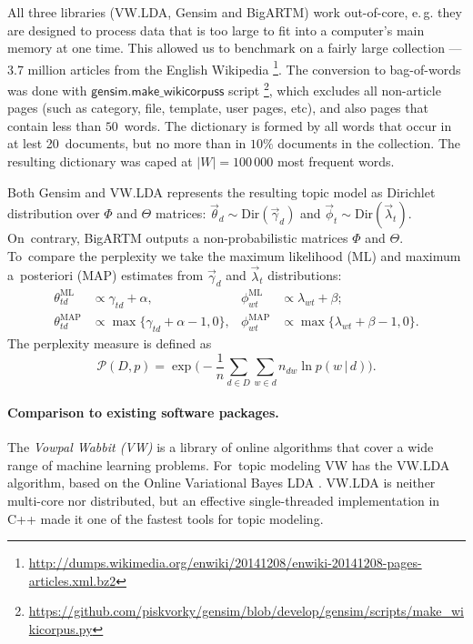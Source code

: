 \documentclass[russian]{llncs}
\newcommand{\cond}{\mspace{3mu}{|}\mspace{3mu}}
\newcommand{\kw}[1]{\textsf{#1}}
\begin{document}
All three libraries (VW.LDA, Gensim and BigARTM) work out-of-core,
e.\,g. they are designed to process data that is too large to fit into a computer's main memory at one time.
This allowed us to benchmark on a fairly large collection --- 3.7 million articles from the English Wikipedia%
\footnote{\url{http://dumps.wikimedia.org/enwiki/20141208/enwiki-20141208-pages-articles.xml.bz2}}.
The conversion to bag-of-words was done with $\kw{gensim.make\_wikicorpuss}$ script%
\footnote{\url{https://github.com/piskvorky/gensim/blob/develop/gensim/scripts/make_wikicorpus.py}},
which excludes all non-article pages (such as category, file, template, user pages, etc),
and also pages that contain less than $50$~words.
The dictionary is formed by all words that occur in at lest 20~documents,
but no more than in $10\%$ documents in the collection.
The resulting dictionary was caped at $|W| = 100\,000$ most frequent words.

Both Gensim and VW.LDA represents the resulting topic model as Dirichlet distribution over $\Phi$ and $\Theta$ matrices:
$\vec{\theta}_{d} \sim \text{Dir}(\vec{\gamma}_d)$ and
$\vec{\phi}_{t} \sim \text{Dir}(\vec{\lambda}_t)$.
On~contrary, BigARTM outputs a non-probabilistic matrices $\Phi$ and $\Theta$.
To~compare the perplexity we take the maximum likelihood (ML) and maximum a~posteriori (MAP) estimates
from $\vec{\gamma}_d$ and $\vec{\lambda}_t$ distributions:
\begin{align*}
	\theta^{\mathrm{ML}}_{td} &\propto \gamma_{td}+\alpha, &
    \phi^{\mathrm{ML}}_{wt} &\propto \lambda_{wt}+\beta;
\\
	\theta^{\mathrm{MAP}}_{td} &\propto \max\{\gamma_{td}+\alpha-1,0\}, &
    \phi^{\mathrm{MAP}}_{wt} &\propto \max\{\lambda_{wt}+\beta-1,0\}.
\end{align*}
The perplexity measure is defined as
\begin{equation}
    \label{eq:perplexity}
    \mathscr{P}(D, p) =
        \exp \biggl( - \frac{1}{n} \sum_{d \in D} \sum_{w \in d} n_{dw} \ln p(w \cond d) \biggr).
\end{equation}

\paragraph{Comparison to existing software packages.}

The \emph{Vowpal Wabbit (VW)} is a library
of online algorithms that cover a wide range of machine learning problems. %
For~topic modeling VW has the VW.LDA algorithm, based on the Online Variational Bayes LDA \cite{hoffman10online}.
VW.LDA is neither multi-core nor distributed,
but an effective single-threaded implementation in C++ made it one of the fastest tools for topic modeling.%
\end{document}
